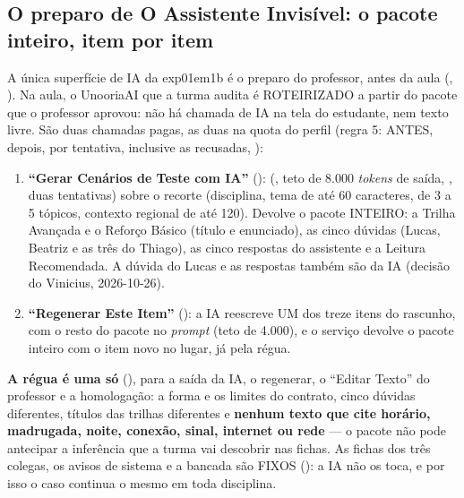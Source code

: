 \subsection{O preparo de O Assistente Invisível: o pacote inteiro, item por item}
\label{sec:ia-preparo-exp01em1b}

A única superfície de IA da exp01em1b é o preparo do professor, antes da aula
(, ). Na aula, o
UnooriaAI que a turma audita é ROTEIRIZADO a partir do pacote que o professor
aprovou: não há chamada de IA na tela do estudante, nem texto livre. São duas
chamadas pagas, as duas na quota do perfil  (regra 5:
 ANTES,  depois, por tentativa, inclusive as
recusadas, ):

\begin{enumerate}
  \item \textbf{\enquote{Gerar Cenários de Teste com IA}} ():
     (, teto de 8.000 \emph{tokens} de saída,
    , duas tentativas) sobre o recorte (disciplina, tema de até
    60 caracteres, de 3 a 5 tópicos, contexto regional de até 120). Devolve
    o pacote INTEIRO: a Trilha Avançada e o Reforço Básico (título e
    enunciado), as cinco dúvidas (Lucas, Beatriz e as três do Thiago), as
    cinco respostas do assistente e a Leitura Recomendada. A dúvida do Lucas
    e as respostas também são da IA (decisão do Vinicius, 2026-10-26).
  \item \textbf{\enquote{Regenerar Este Item}} (): a IA reescreve UM dos treze itens do
    rascunho, com o resto do pacote no \emph{prompt} (teto de 4.000), e o
    serviço devolve o pacote inteiro com o item novo no lugar, já pela régua.
\end{enumerate}

\textbf{A régua é uma só} (),
para a saída da IA, o regenerar, o \enquote{Editar Texto} do professor e a
homologação: a forma e os limites do contrato, cinco dúvidas diferentes,
títulos das trilhas diferentes e \textbf{nenhum texto que cite horário,
madrugada, noite, conexão, sinal, internet ou rede} --- o pacote não pode
antecipar a inferência que a turma vai descobrir nas fichas. As fichas dos
três colegas, os avisos de sistema e a bancada são FIXOS ():
a IA não os toca, e por isso o caso continua o mesmo em toda disciplina.

